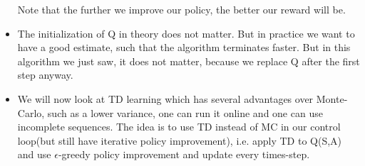 \documentclass[a4paper]{article}
\begin{document}
\begin{itemize}
\newline Note that the further we improve our policy, the better our reward will be. 
\item The initialization of Q in theory does not matter. But in practice we want to have a good estimate, such that the algorithm terminates faster. But in this algorithm we just saw, it does not matter, because we replace Q after the first step anyway. 
\item We will now look at TD learning which has several advantages over Monte-Carlo, such as a lower variance, one can run it online and one can use incomplete sequences. The idea  is to use TD instead of MC in our control loop(but still have iterative policy improvement), i.e.  apply TD to Q(S,A) and use $\epsilon$-greedy policy improvement and update every times-step.
\end{itemize}
\end{document}
